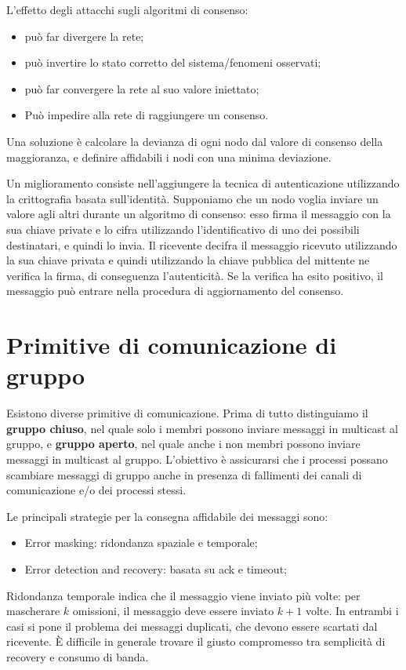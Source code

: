 \vspace{5mm}

L'effetto degli attacchi sugli algoritmi di consenso:
\begin{itemize}
    \item può far divergere la rete;
    \item può invertire lo stato corretto del sistema/fenomeni osservati;
    \item può far convergere la rete al suo valore iniettato;
    \item Può impedire alla rete di raggiungere un consenso.
\end{itemize}
Una soluzione è calcolare la devianza di ogni nodo dal valore di consenso della maggioranza, e definire affidabili i nodi con una minima deviazione.

Un miglioramento consiste nell'aggiungere la tecnica di autenticazione utilizzando la crittografia basata sull'identità. Supponiamo che un nodo voglia inviare un valore agli altri durante un algoritmo di consenso: esso firma il messaggio con la sua chiave private e lo cifra utilizzando l'identificativo di uno dei possibili destinatari, e quindi lo invia. Il ricevente decifra il messaggio ricevuto utilizzando la sua chiave privata e quindi utilizzando la chiave pubblica del mittente ne verifica la firma, di conseguenza l'autenticità. Se la verifica ha esito positivo, il messaggio può entrare nella procedura di aggiornamento del consenso.


\section{Primitive di comunicazione di gruppo}
Esistono diverse primitive di comunicazione. Prima di tutto distinguiamo il \textbf{gruppo chiuso}, nel quale solo i membri possono inviare messaggi in multicast al gruppo, e \textbf{gruppo aperto}, nel quale anche i non membri possono inviare messaggi in multicast al gruppo. L'obiettivo è assicurarsi che i processi possano scambiare messaggi di gruppo anche in presenza di fallimenti dei canali di comunicazione e/o dei processi stessi.

\vspace{5mm}

Le principali strategie per la consegna affidabile dei messaggi sono:
\begin{itemize}
    \item Error masking: ridondanza spaziale e temporale;
    \item Error detection and recovery: basata su ack e timeout;
\end{itemize}
Ridondanza temporale indica che il messaggio viene inviato più volte: per mascherare $k$ omissioni, il messaggio deve essere inviato $k+1$ volte. In entrambi i casi si pone il problema dei messaggi duplicati, che devono essere scartati dal ricevente. È difficile in generale trovare il giusto compromesso tra semplicità di recovery e consumo di banda.
